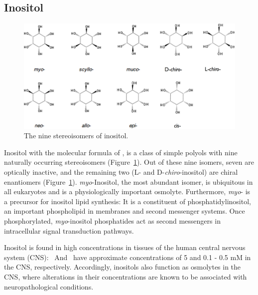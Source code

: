 \subsection{Inositol}
\begin{figure}
	\centering
	\includegraphics[width=5in]{figures/introduction/inositol.pdf}
	\caption[Inositol stereoisomers]{The nine stereoisomers of inositol.}
	\label{fig:inositols}
\end{figure}

Inositol with the molecular formula of , is a class of simple polyols with nine naturally occurring stereoisomers (Figure~\ref{fig:inositols}). Out of these nine isomers, seven are optically inactive, and the remaining two (L- and D-\emph{chiro}-inositol) are chiral enantiomers (Figure~\ref{fig:inositols}). \emph{myo}-Inositol, the most abundant isomer, is ubiquitous in all eukaryotes and is a physiologically important osmolyte. Furthermore, \emph{myo}- is a precursor for inositol lipid synthesis: It is a constituent of phosphatidylinositol, an important phospholipid in membranes and second messenger systems. Once phosphorylated, \emph{myo}-inositol phosphatides act as second messengers in intracellular signal transduction pathways.\cite{Fisher:2002tk} 

Inositol is found in high concentrations in tissues of the human central nervous system (CNS): \myo\ And \scylloi\ have approximate concentrations of 5 and 0.1 - 0.5 mM in the CNS, respectively.\cite{Fisher:2002tk} Accordingly, inositols also function as osmolytes in the CNS, where alterations in their concentrations are known to be associated with neuropathological conditions.\cite{Michaelis:1993gf, Fisher:2002tk}

